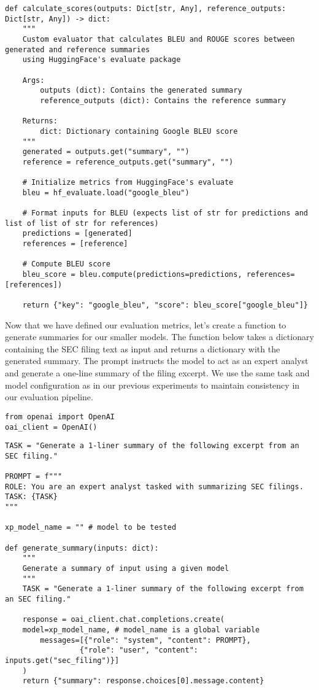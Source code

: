 \begin{verbatim}
def calculate_scores(outputs: Dict[str, Any], reference_outputs: Dict[str, Any]) -> dict:
    """
    Custom evaluator that calculates BLEU and ROUGE scores between generated and reference summaries
    using HuggingFace's evaluate package
    
    Args:
        outputs (dict): Contains the generated summary
        reference_outputs (dict): Contains the reference summary
    
    Returns:
        dict: Dictionary containing Google BLEU score
    """
    generated = outputs.get("summary", "")
    reference = reference_outputs.get("summary", "")
    
    # Initialize metrics from HuggingFace's evaluate
    bleu = hf_evaluate.load("google_bleu")
    
    # Format inputs for BLEU (expects list of str for predictions and list of list of str for references)
    predictions = [generated]
    references = [reference]
    
    # Compute BLEU score
    bleu_score = bleu.compute(predictions=predictions, references=[references])
    
    return {"key": "google_bleu", "score": bleu_score["google_bleu"]}
\end{verbatim}
Now that we have defined our evaluation metrics, let's create a function to generate summaries for our smaller models. The function below takes a dictionary containing the SEC filing text as input and returns a dictionary with the generated summary. The prompt instructs the model to act as an expert analyst and generate a one-line summary of the filing excerpt. We use the same task and model configuration as in our previous experiments to maintain consistency in our evaluation pipeline.

\begin{verbatim}
from openai import OpenAI
oai_client = OpenAI()
\end{verbatim}

\begin{verbatim}
TASK = "Generate a 1-liner summary of the following excerpt from an SEC filing."

PROMPT = f"""
ROLE: You are an expert analyst tasked with summarizing SEC filings.
TASK: {TASK}
"""

xp_model_name = "" # model to be tested

def generate_summary(inputs: dict):
    """
    Generate a summary of input using a given model
    """
    TASK = "Generate a 1-liner summary of the following excerpt from an SEC filing."
    
    response = oai_client.chat.completions.create(
    model=xp_model_name, # model_name is a global variable
        messages=[{"role": "system", "content": PROMPT},
                 {"role": "user", "content": inputs.get("sec_filing")}]
    )
    return {"summary": response.choices[0].message.content}
\end{verbatim}

